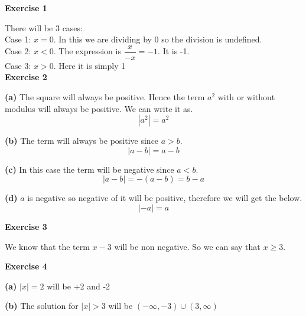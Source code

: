 \documentclass[10pt]{article}
\begin{document}
\textbf{Exercise 1}

There will be 3 cases:\\

Case 1: $x = 0$. In this we are dividing by 0 so the division is undefined.\\

Case 2: $x < 0$. The expression is $\dfrac{x}{-x} = -1$. It is -1.\\

Case 3: $x > 0$. Here it is simply 1\\

\textbf{Exercise 2}

\textbf{(a)}
The square will always be positive. Hence the term $a^2$ with or without modulus will always be positive.
We can write it as.
\[
|a^2| = a^2
\] 

\textbf{(b)}
The term will always be positive since $a > b$. 
\[
|a - b| = a - b
\]

\textbf{(c)}
In this case the term will be negative since $a < b$.
\[
|a - b| = - (a - b) = b - a
\]

\textbf{(d)}
$a$ is negative so negative of it will be positive, therefore we will get the below.
\[
|- a| = a
\]


\textbf{Exercise 3}

We know that the term $x - 3$ will be non negative. So we can say that $x \ge 3$.

\textbf{Exercise 4}

\textbf{(a)}
$|x| = 2$ will be +2 and -2

\begin{center}
\end{center}

\textbf{(b)}
The solution for $|x| > 3$ will be $(-\infty, -3) \cup (3, \infty)$
\end{document}
